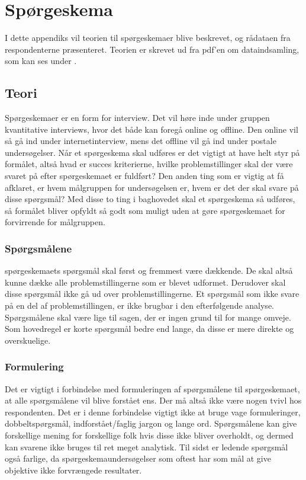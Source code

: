\chapter{Spørgeskema}
I dette appendiks vil teorien til spørgeskemaer blive beskrevet, og rådataen fra respondenterne præsenteret. Teorien er skrevet ud fra pdf'en om dataindsamling, som kan ses under \citep{metodeogprojektskrivning}.
\section{Teori}
Spørgeskemaer er en form for interview. Det vil høre inde under gruppen kvantitative interviews, hvor det både kan foregå online og offline. Den online vil så gå ind under internetinterview, mens det offline vil gå ind under postale undersøgelser. \citep{kvantitativ} \newline
Når et spørgeskema skal udføres er det vigtigt at have helt styr på formålet, altså hvad er succes kriterierne, hvilke problemstillinger skal der være svaret på efter spørgeskemaet er fuldført? Den anden ting som er vigtig at få afklaret, er hvem målgruppen for undersøgelsen er, hvem er det der skal svare på disse spørgsmål? Med disse to ting i baghovedet skal et spørgeskema så udføres, så formålet bliver opfyldt så godt som muligt uden at gøre spørgeskemaet for forvirrende for målgruppen.

\subsection{Spørgsmålene}
spørgeskemaets spørgsmål skal først og fremmest være dækkende. De skal altså kunne dække alle problemstillingerne som er blevet udformet. Derudover skal disse spørgsmål ikke gå ud over problemstillingerne. Et spørgsmål som ikke svare på en del af problemstillingen, er ikke brugbar i den efterfølgende analyse. Spørgsmålene skal være lige til sagen, der er ingen grund til for mange omveje.\newline
Som hovedregel er korte spørgsmål bedre end lange, da disse er mere direkte og overskuelige. 

\subsection{Formulering}
Det er vigtigt i forbindelse med formuleringen af spørgsmålene til spørgeskemaet, at alle spørgsmålene vil blive forstået ens. Der må altså ikke være nogen tvivl hos respondenten. Det er i denne forbindelse vigtigt ikke at bruge vage formuleringer, dobbeltspørgsmål, indforstået/faglig jargon og lange ord. Spørgsmålene kan give forskellige mening for forskellige folk hvis disse ikke bliver overholdt, og dermed kan svarene ikke bruges til ret meget analytisk.\newline
Til sidst er ledende spørgsmål også farlige, da spørgeskemaundersøgelser som oftest har som mål at give objektive ikke forvrængede resultater.


